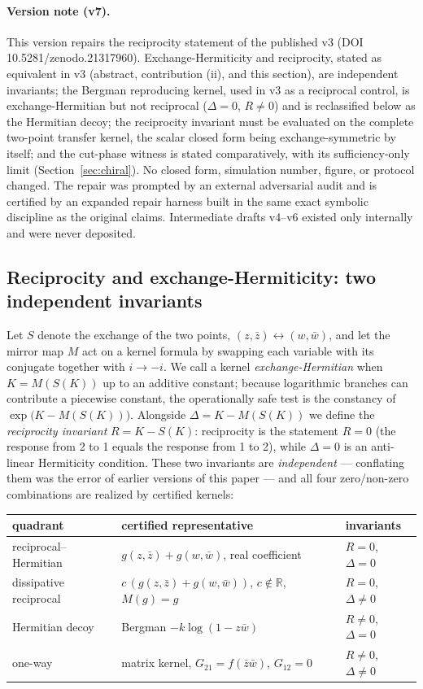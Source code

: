 \documentclass[11pt,a4paper]{article}
\newcommand{\zb}{\bar{z}}
\newcommand{\wb}{\bar{w}}
\begin{document}
\paragraph{Version note (v7).} This version repairs the reciprocity statement
of the published v3 (DOI 10.5281/zenodo.21317960). Exchange-Hermiticity and
reciprocity, stated as equivalent in v3 (abstract, contribution (ii), and this
section), are independent invariants; the Bergman reproducing kernel, used in
v3 as a reciprocal control, is exchange-Hermitian but not reciprocal
($\Delta = 0$, $R \neq 0$) and is reclassified below as the Hermitian decoy;
the reciprocity invariant must be evaluated on the complete two-point transfer
kernel, the scalar closed form being exchange-symmetric by itself; and the
cut-phase witness is stated comparatively, with its sufficiency-only limit
(Section~\ref{sec:chiral}). No closed form, simulation number, figure, or
protocol changed. The repair was prompted by an external adversarial audit and
is certified by an expanded repair harness built in the same exact symbolic
discipline as the original claims. Intermediate drafts v4--v6 existed only
internally and were never deposited.

\subsection{Reciprocity and exchange-Hermiticity: two independent invariants}
\label{sec:mirror}

Let $S$ denote the exchange of the two points, $(z, \zb) \leftrightarrow (w, \wb)$,
and let the mirror map $M$ act on a kernel formula by swapping each variable with
its conjugate together with $i \to -i$. We call a kernel
\emph{exchange-Hermitian} when $K = M(S(K))$ up to an additive constant; because
logarithmic branches can contribute a piecewise constant, the operationally safe
test is the constancy of $\exp\!\bigl(K - M(S(K))\bigr)$. Alongside
$\Delta = K - M(S(K))$ we define the \emph{reciprocity invariant}
$R = K - S(K)$: reciprocity is the statement $R = 0$ (the response from 2 to 1
equals the response from 1 to 2), while $\Delta = 0$ is an anti-linear
Hermiticity condition. These two invariants are \emph{independent} ---
conflating them was the error of earlier versions of this paper --- and all
four zero/non-zero combinations are realized by certified kernels:

\begin{center}
\begin{tabular}{lll}
\hline
quadrant & certified representative & invariants \\
\hline
reciprocal--Hermitian & $g(z,\zb) + g(w,\wb)$, real coefficient & $R = 0$, $\Delta = 0$ \\
dissipative reciprocal & $c\,(g(z,\zb) + g(w,\wb))$, $c \notin \mathbb{R}$, $M(g) = g$ & $R = 0$, $\Delta \neq 0$ \\
Hermitian decoy & Bergman $-k\log(1 - z\wb)$ & $R \neq 0$, $\Delta = 0$ \\
one-way & matrix kernel, $G_{21} = f(\zb\wb)$, $G_{12} = 0$ & $R \neq 0$, $\Delta \neq 0$ \\
\hline
\end{tabular}
\end{center}
\end{document}
